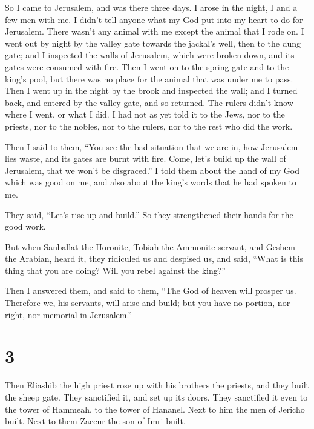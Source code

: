  So I came to Jerusalem, and was there three days.
 I arose in the night, I and a few men with me. I didn't
tell anyone what my God put into my heart to do for Jerusalem. There
wasn't any animal with me except the animal that I rode on.
 I went out by night by the valley gate towards the
jackal's well, then to the dung gate; and I inspected the walls of
Jerusalem, which were broken down, and its gates were consumed with
fire.  Then I went on to the spring gate and to the
king's pool, but there was no place for the animal that was under me to
pass.  Then I went up in the night by the brook and
inspected the wall; and I turned back, and entered by the valley gate,
and so returned.  The rulers didn't know where I went, or
what I did. I had not as yet told it to the Jews, nor to the priests,
nor to the nobles, nor to the rulers, nor to the rest who did the work.

 Then I said to them, ``You see the bad situation that we
are in, how Jerusalem lies waste, and its gates are burnt with fire.
Come, let's build up the wall of Jerusalem, that we won't be
disgraced.''  I told them about the hand of my God which
was good on me, and also about the king's words that he had spoken to
me.

They said, ``Let's rise up and build.'' So they strengthened their hands
for the good work.

 But when Sanballat the Horonite, Tobiah the Ammonite
servant, and Geshem the Arabian, heard it, they ridiculed us and
despised us, and said, ``What is this thing that you are doing? Will you
rebel against the king?''

 Then I answered them, and said to them, ``The God of
heaven will prosper us. Therefore we, his servants, will arise and
build; but you have no portion, nor right, nor memorial in Jerusalem.''

\hypertarget{section-2}{%
\section{3}\label{section-2}}

 Then Eliashib the high priest rose up with his brothers
the priests, and they built the sheep gate. They sanctified it, and set
up its doors. They sanctified it even to the tower of Hammeah, to the
tower of Hananel.  Next to him the men of Jericho built.
Next to them Zaccur the son of Imri built.

